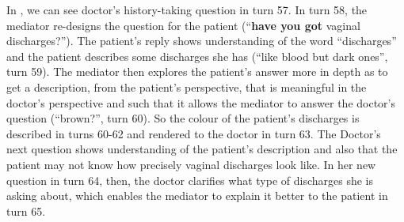 \documentclass[output=paper]{LSP/langsci}
\begin{document}
  In , we can see doctor's history-taking question in turn 57. In turn 58, the mediator re-designs the question for the patient (``\textbf{have you got} vaginal discharges?''). The patient's reply shows understanding of the word ``discharges'' and the patient describes some discharges she has (``like blood but dark ones'', turn 59). The mediator then explores the patient's answer more in depth as to get a description, from the patient's perspective, that is meaningful in the doctor's perspective and such that it allows the mediator to answer the doctor's question (``brown?'', turn 60). So the colour of the patient's discharges is described in turns 60-62 and rendered to the doctor in turn 63. The Doctor's next question shows understanding of the patient's description and also that the patient may not know how precisely vaginal discharges look like. In her new question in turn 64, then, the doctor clarifies what type of discharges she is asking about, which enables the mediator to explain it better to the patient in turn 65.
\end{document}

